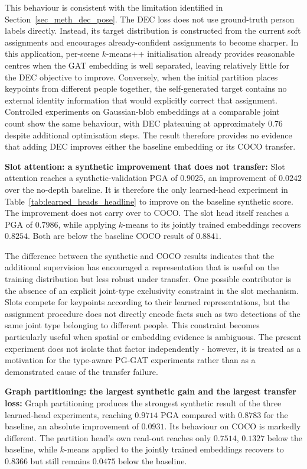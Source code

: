 This behaviour is consistent with the limitation identified in
Section~\ref{sec_meth_dec_pose}.
The DEC loss does not use ground-truth person labels directly.
Instead, its target distribution is constructed from the current
soft assignments and encourages already-confident assignments
to become sharper.
In this application, per-scene $k$-means++ initialisation
already provides reasonable centres when the GAT embedding
is well separated,
leaving relatively little for the DEC objective to improve.
Conversely, when the initial partition places keypoints
from different people together,
the self-generated target contains no external identity information
that would explicitly correct that assignment.
Controlled experiments on Gaussian-blob embeddings at a comparable
joint count show the same behaviour,
with DEC plateauing at approximately $0.76$ despite additional
optimisation steps.
The result therefore provides no evidence that adding DEC improves
either the baseline embedding or its COCO transfer.

\textbf{Slot attention: a synthetic improvement that does not transfer:}
Slot attention reaches a synthetic-validation PGA of $0.9025$,
an improvement of $0.0242$ over the no-depth baseline.
It is therefore the only learned-head experiment
in Table~\ref{tab:learned_heads_headline} to improve on the baseline
synthetic score.
The improvement does not carry over to COCO.
The slot head itself reaches a PGA of $0.7986$,
while applying $k$-means to its jointly trained embeddings recovers
$0.8254$.
Both are below the baseline COCO result of $0.8841$.

The difference between the synthetic and COCO results indicates that
the additional supervision has encouraged a representation that is
useful on the training distribution
but less robust under transfer.
One possible contributor is the absence of an explicit joint-type
exclusivity constraint in the slot mechanism.
Slots compete for keypoints according to their learned representations,
but the assignment procedure does not directly encode facts such as
two detections of the same joint type belonging to different people.
This constraint becomes particularly useful when spatial or embedding
evidence is ambiguous.
The present experiment does not isolate that factor independently -
however, it is treated as a motivation for the type-aware PG-GAT
experiments rather than as a demonstrated cause of the transfer failure.

\textbf{Graph partitioning: the largest synthetic gain and the largest
transfer loss:}
Graph partitioning produces the strongest synthetic result of the three
learned-head experiments,
reaching $0.9714$ PGA compared with $0.8783$ for the baseline,
an absolute improvement of $0.0931$.
Its behaviour on COCO is markedly different.
The partition head's own read-out reaches only $0.7514$,
$0.1327$ below the baseline,
while $k$-means applied to the jointly trained embeddings recovers
to $0.8366$ but still remains $0.0475$ below the baseline.

